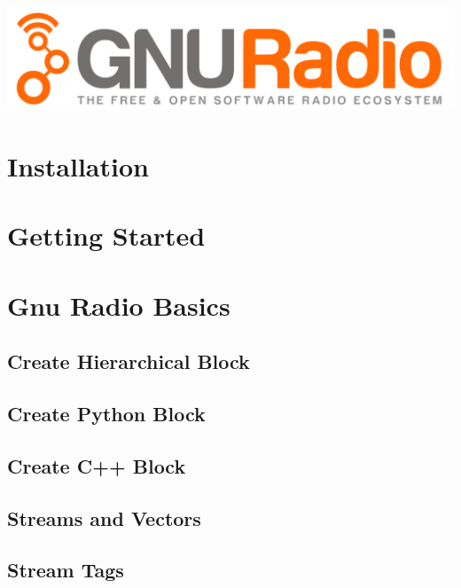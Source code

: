 \documentclass[10pt]{article}
\begin{document}
\includegraphics[width=0.95\linewidth]{gnuradio_logo_web}


\begin{multicols*}{3}
\section{Installation}




\section{Getting Started}


\section{Gnu Radio Basics}

\subsection{Create Hierarchical Block}



\subsection{Create Python Block}



\subsection{Create C++ Block}

\subsection{Streams and Vectors}

\subsection{Stream Tags}


\end{multicols*}
\end{document}
